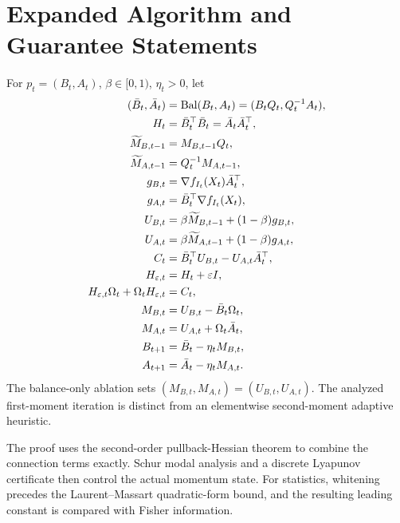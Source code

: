 \section{Expanded Algorithm and Guarantee Statements}
\label{app:expanded-guarantees}


\begin{definition}
For $p_t=(B_t,A_t)$, $\beta\in[0,1)$, $\eta_t>0$, let
\begin{align}
(\bar B_t,\bar A_t)&={\rm Bal}(B_t,A_t)
=(B_tQ_t,Q_t^{-1}A_t),\\
H_t&=\bar B_t^\top\bar B_t=\bar A_t\bar A_t^\top,\\
\widetilde M_{B,t-1}&=M_{B,t-1}Q_t,\\
\widetilde M_{A,t-1}&=Q_t^{-1}M_{A,t-1},\\
g_{B,t}&=\nabla f_{I_t}(X_t)\bar A_t^\top,\\
g_{A,t}&=\bar B_t^\top\nabla f_{I_t}(X_t),\\
U_{B,t}&=\beta\widetilde M_{B,t-1}+(1-\beta)g_{B,t},\\
U_{A,t}&=\beta\widetilde M_{A,t-1}+(1-\beta)g_{A,t},\\
C_t&=\bar B_t^\top U_{B,t}-U_{A,t}\bar A_t^\top,\\
H_{\varepsilon,t}&=H_t+\varepsilon I,\\
H_{\varepsilon,t}\Omega_t+\Omega_tH_{\varepsilon,t}&=C_t,\\
M_{B,t}&=U_{B,t}-\bar B_t\Omega_t,\\
M_{A,t}&=U_{A,t}+\Omega_t\bar A_t,\\
B_{t+1}&=\bar B_t-\eta_tM_{B,t},\\
A_{t+1}&=\bar A_t-\eta_tM_{A,t}.
\label{eq:main-iteration}
\end{align}
The balance-only ablation sets $(M_{B,t},M_{A,t})=(U_{B,t},U_{A,t})$.
The analyzed first-moment iteration is distinct from an elementwise
second-moment adaptive heuristic.
\end{definition}

The proof uses the second-order pullback-Hessian theorem
\citep[Proposition 5.45]{boumal2023introduction} to combine the connection
terms exactly. Schur modal analysis and a discrete Lyapunov certificate
then control the actual momentum state. For statistics, whitening
precedes the Laurent--Massart quadratic-form bound, and the resulting
leading constant is compared with Fisher information.


